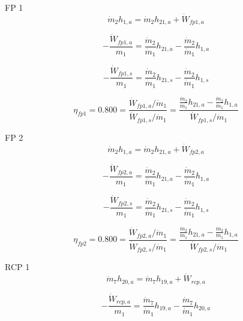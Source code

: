 \documentclass{article}
\begin{document}
FP 1
\begin{equation}
\dot{m}_{ 2}h_{ 1,a} = \dot{m}_{ 2}h_{21,a} + \dot{W}_{fp1,a}
\end{equation}

\begin{equation}
-\frac{\dot{W}_{fp1,a}}{m_1} = \frac{\dot{m}_{ 2}}{\dot{m}_{ 1}}h_{21,a} - \frac{\dot{m}_{ 2}}{\dot{m}_{ 1}}h_{ 1,a}\end{equation}

\begin{equation}
-\frac{\dot{W}_{fp1,s}}{m_1} = \frac{\dot{m}_{ 2}}{\dot{m}_{ 1}}h_{21,s} - \frac{\dot{m}_{ 2}}{\dot{m}_{ 1}}h_{ 1,s}\end{equation}

\begin{equation}
\eta_{fp1} =    0.800 = \frac{\dot{W}_{fp1,a} / \dot{m}_{1}}{\dot{W}_{fp1,s} / \dot{m}_{1}} = \frac{
\frac{\dot{m}_{ 2}}{\dot{m}_{ 1}}h_{21,a} - \frac{\dot{m}_{ 2}}{\dot{m}_{ 1}}h_{ 1,a}}{\dot{W}_{fp1,s} / \dot{m}_{1}}
\end{equation}


FP 2
\begin{equation}
\dot{m}_{ 2}h_{ 1,a} = \dot{m}_{ 2}h_{21,a} + \dot{W}_{fp2,a}
\end{equation}

\begin{equation}
-\frac{\dot{W}_{fp2,a}}{m_1} = \frac{\dot{m}_{ 2}}{\dot{m}_{ 1}}h_{21,a} - \frac{\dot{m}_{ 2}}{\dot{m}_{ 1}}h_{ 1,a}\end{equation}

\begin{equation}
-\frac{\dot{W}_{fp2,s}}{m_1} = \frac{\dot{m}_{ 2}}{\dot{m}_{ 1}}h_{21,s} - \frac{\dot{m}_{ 2}}{\dot{m}_{ 1}}h_{ 1,s}\end{equation}

\begin{equation}
\eta_{fp2} =    0.800 = \frac{\dot{W}_{fp2,a} / \dot{m}_{1}}{\dot{W}_{fp2,s} / \dot{m}_{1}} = \frac{
\frac{\dot{m}_{ 2}}{\dot{m}_{ 1}}h_{21,a} - \frac{\dot{m}_{ 2}}{\dot{m}_{ 1}}h_{ 1,a}}{\dot{W}_{fp2,s} / \dot{m}_{1}}
\end{equation}


RCP 1
\begin{equation}
\dot{m}_{ 7}h_{20,a} = \dot{m}_{ 7}h_{19,a} + \dot{W}_{rcp,a}
\end{equation}

\begin{equation}
-\frac{\dot{W}_{rcp,a}}{m_1} = \frac{\dot{m}_{ 7}}{\dot{m}_{ 1}}h_{19,a} - \frac{\dot{m}_{ 7}}{\dot{m}_{ 1}}h_{20,a}\end{equation}
\end{document}
